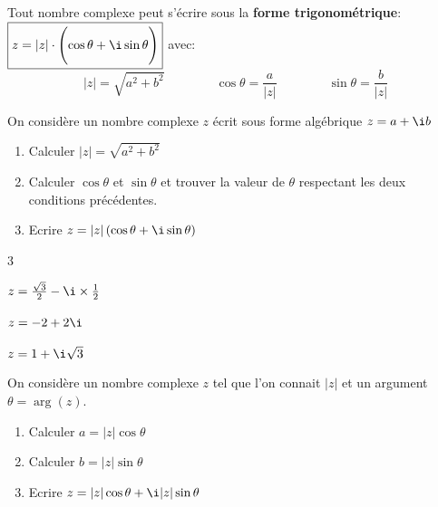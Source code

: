 \begin{definition}
		Tout nombre complexe peut s'écrire sous la \textbf{forme trigonométrique}: $\boxed{z=|z|\cdot \Biggl(\cos \theta + \i \sin \theta \Biggr)}$ avec:
\smallskip
		\[\boxed{|z|=\sqrt{a^2+b^2} \qquad \qquad \cos \theta = \dfrac{a}{|z|} \qquad \qquad \sin \theta = \dfrac{b}{|z|}}\]

	\end{definition}

\begin{methode}

	On considère un nombre complexe $z$ écrit sous forme algébrique $z=a+\i b$ 

	\begin{enumerate}
		\item Calculer $|z|=\sqrt{a^2+b^2}$
		\item Calculer $\cos \theta$ et $\sin \theta$ et trouver la valeur de $\theta$ respectant les deux conditions précédentes.
		\item Ecrire $z=|z|\left(\cos \theta + \i \sin \theta \right)$
	\end{enumerate}

\end{methode}

\begin{exercice_cours}

	\begin{enumerate}

	\end{enumerate}

\end{exercice_cours}


\begin{methode}

	On considère un nombre complexe $z$ tel que l'on connait $|z|$ et un argument $\theta=\arg(z)$. 

	\begin{enumerate}
		\item Calculer $a=|z|\cos\theta$
		\item Calculer $b=|z|\sin\theta$
		\item Ecrire $z=|z|\cos\theta + \i |z|\sin\theta$
	\end{enumerate}

\end{methode}


